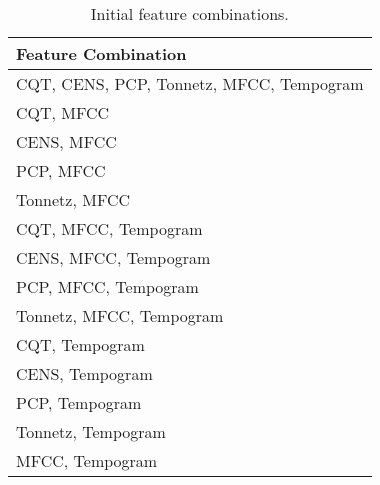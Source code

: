 \begin{table}[t]
    \centering
    \begin{tabular}{|l|}
    \hline
    \textbf{Feature Combination}             \\ \hline\hline
    CQT, CENS, PCP, Tonnetz, MFCC, Tempogram \\ \hline
    CQT, MFCC                                \\ \hline
    CENS, MFCC                               \\ \hline
    PCP, MFCC                                \\ \hline
    Tonnetz, MFCC                            \\ \hline
    CQT, MFCC, Tempogram                     \\ \hline
    CENS, MFCC, Tempogram                    \\ \hline
    PCP, MFCC, Tempogram                     \\ \hline
    Tonnetz, MFCC, Tempogram                 \\ \hline
    CQT, Tempogram                           \\ \hline
    CENS, Tempogram                          \\ \hline
    PCP, Tempogram                           \\ \hline
    Tonnetz, Tempogram                       \\ \hline
    MFCC, Tempogram                          \\ \hline
    \end{tabular}
    \caption{Initial feature combinations.}
    \label{tab:init_feature_combo}
\end{table}